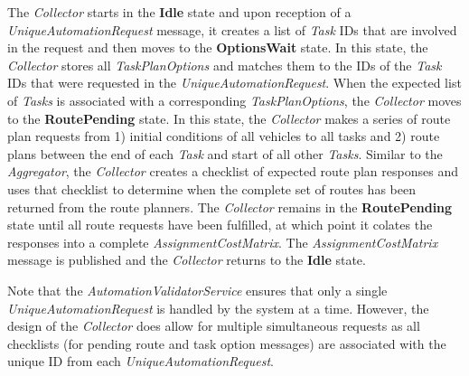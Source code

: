 The \emph{Collector} starts in the \textbf{Idle} state and upon
reception of a \emph{UniqueAutomationRequest} message, it creates a list
of \emph{Task} IDs that are involved in the request and then moves to
the \textbf{OptionsWait} state. In this state, the \emph{Collector}
stores all \emph{TaskPlanOptions} and matches them to the IDs of the
\emph{Task} IDs that were requested in the
\emph{UniqueAutomationRequest}. When the expected list of \emph{Tasks}
is associated with a corresponding \emph{TaskPlanOptions}, the
\emph{Collector} moves to the \textbf{RoutePending} state. In this
state, the \emph{Collector} makes a series of route plan requests from
1) initial conditions of all vehicles to all tasks and 2) route plans
between the end of each \emph{Task} and start of all other \emph{Tasks}.
Similar to the \emph{Aggregator}, the \emph{Collector} creates a
checklist of expected route plan responses and uses that checklist to
determine when the complete set of routes has been returned from the
route planners. The \emph{Collector} remains in the
\textbf{RoutePending} state until all route requests have been
fulfilled, at which point it colates the responses into a complete
\emph{AssignmentCostMatrix}. The \emph{AssignmentCostMatrix} message is
published and the \emph{Collector} returns to the \textbf{Idle} state.

Note that the \emph{AutomationValidatorService} ensures that only a
single \emph{UniqueAutomationRequest} is handled by the system at a
time. However, the design of the \emph{Collector} does allow for
multiple simultaneous requests as all checklists (for pending route and
task option messages) are associated with the unique ID from each
\emph{UniqueAutomationRequest}.

